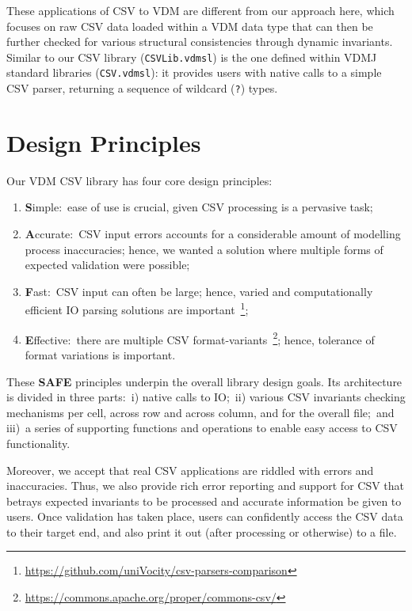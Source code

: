 \documentclass[runningheads,a4paper]{llncs}
\begin{document}
These applications of CSV to VDM are different from our approach here, which focuses on raw CSV data loaded within a VDM data type that can then be further checked for various structural consistencies through dynamic invariants. Similar to our CSV library (\texttt{CSVLib.vdmsl}) is the one defined within VDMJ standard libraries (\texttt{CSV.vdmsl}): it provides users with native calls to a simple CSV parser, returning a sequence of wildcard (\texttt{?}) types. 


\section{Design Principles}\label{sec:principles}

Our VDM CSV library has four core design principles:

	\begin{enumerate}
		\item \textbf{S}imple:~ease of use is crucial, given CSV processing is a pervasive task;
		 
		\item \textbf{A}ccurate:~CSV input errors accounts for a considerable amount of modelling process inaccuracies; hence, we wanted a solution where multiple forms of expected validation were possible;
		 
		\item \textbf{F}ast:~CSV input can often be large; hence, varied and computationally efficient IO parsing solutions are important~\footnote{\url{https://github.com/uniVocity/csv-parsers-comparison}};
		 
		\item \textbf{E}ffective:~there are multiple CSV format-variants~\footnote{\url{https://commons.apache.org/proper/commons-csv/}}; hence, tolerance of format variations is important.   
	\end{enumerate}

These \textbf{SAFE} principles underpin the overall library design goals. Its architecture is divided in three parts:~i) native calls to IO;~ii) various CSV invariants checking mechanisms per cell, across row and across column, and for the overall file;~and iii)~a series of supporting functions and operations to enable easy access to CSV functionality. 

Moreover, we accept that real CSV applications are riddled with errors and inaccuracies. Thus, we also provide rich error reporting and support for CSV that betrays expected invariants to be processed and accurate information be given to users.  Once validation has taken place, users can confidently access the CSV data to their target end, and also print it out (after processing or otherwise) to a file. 
\end{document}
